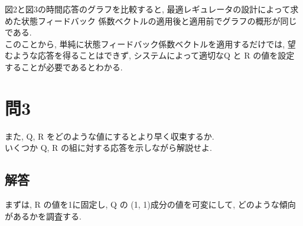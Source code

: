 \documentclass{jsarticle}
\begin{document}
図2と図3の時間応答のグラフを比較すると, 最適レギュレータの設計によって求めた状態フィードバック
\hspace*{1zw}係数ベクトルの適用後と適用前でグラフの概形が同じである.\\

このことから, 単純に状態フィードバック係数ベクトルを適用するだけでは, 望むような応答を得ることは\hspace*{1zw}できず, 
システムによって適切なQ と R の値を設定することが必要であるとわかる.

\section*{問3}
また, Q, R をどのような値にするとより早く収束するか.\\
\hspace*{1zw}いくつか Q, R の組に対する応答を示しながら解説せよ.\\

\vspace*{4mm}\subsection*{解答}
まずは, R の値を1に固定し, Q の (1, 1)成分の値を可変にして, どのような傾向があるかを調査する.
\end{document}
